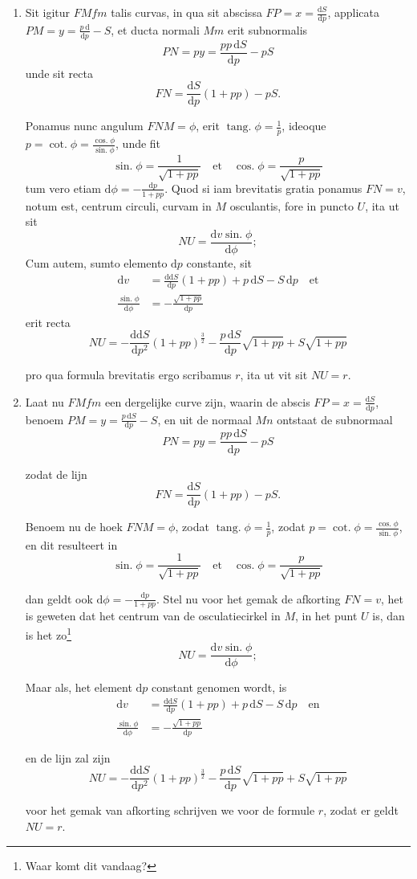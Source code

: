 \documentclass[10pt,a4paper]{article}
\newcommand{\switchenum}{\setcounter{enumi}{\arabic{enumi}-1}\switchcolumn}
\DeclareMathOperator{\tang}{tang.}
\DeclareMathOperator{\cotg}{cot.}
\DeclareMathOperator{\sing}{sin.}
\DeclareMathOperator{\cosg}{cos.}
\def\D{\mathrm{d}}
\begin{document}
\begin{paracol}{2}
\begin{enumerate}[topsep=1px]
		\item Sit igitur $FMfm$ talis curvas, in qua sit abscissa $FP=x=\frac{\D S}{\D p}$, applicata $PM=y=\frac{p\,\D }{\D p}-S$, et ducta normali $Mm$ erit subnormalis
		\[
			PN = py = \frac{pp\,\D S}{\D p}-pS
		\]
		unde sit recta
		\[
			FN = \frac{\D S}{\D p}(1+pp)-pS.
		\]
		\par Ponamus nunc angulum $FNM = \phi$, erit $\tang \phi = \frac{1}{p}$, ideoque $p=\cotg \phi = \frac{\cosg \phi}{\sing \phi}$, unde fit
		\[
			\sing \phi = \frac{1}{\sqrt{1+pp}} \quad \text{et} \quad \cosg \phi = \frac{p}{\sqrt{1+pp}}
		\]
		tum vero etiam $\D \phi = -\frac{\D p}{1+pp}$. Quod si iam brevitatis gratia ponamus $FN=v$, notum est, centrum circuli, curvam in $M$ osculantis, fore in puncto $U$, ita ut sit
		\[
			NU = \frac{\D v\sing \phi}{\D \phi};
		\]
		Cum autem, sumto elemento $\D p$ constante, sit
		\begin{align*}
			\D  v &= \frac{\D \D  S}{\D p}(1+pp)+p\,\D S-S\,\D p \quad \text{et}\\
			\frac{\sing \phi}{\D \phi} &= -\frac{\sqrt{1+pp}}{\D p}
		\end{align*}
		erit recta
		\[
			NU = -\frac{\D\D S}{\D p^2} (1+pp)^{\frac{3}{2}}-\frac{p\,\D S}{\D p} \sqrt{1+pp} + S\sqrt{1+pp}
		\]
		\par pro qua formula brevitatis ergo scribamus $r$, ita ut vit sit $NU=r$.
		
		\switchenum
		\item Laat nu $FMfm$ een dergelijke curve zijn, waarin de abscis $FP=x=\frac{\D S}{\D p}$, benoem $PM=y=\frac{p\, \D S}{\D p}-S$, en uit de normaal $Mn$ ontstaat de subnormaal
		\[
			PN = py = \frac{pp\,\D S}{\D p}-pS
		\]
		\par zodat de lijn
		\[
			FN = \frac{\D S}{\D p}(1+pp)-pS.
		\]
		\par Benoem nu de hoek $FNM = \phi$, zodat $\tang \phi = \frac{1}{p}$, zodat $p = \cotg \phi = \frac{\cosg \phi}{\sing \phi}$, en dit resulteert in
		\[
			\sing \phi = \frac{1}{\sqrt{1+pp}} \quad \text{et} \quad \cosg \phi = \frac{p}{\sqrt{1+pp}}
		\]
		\par dan geldt ook $\D \phi = -\frac{\D p}{1+pp}$. Stel nu voor het gemak de afkorting $FN=v$, het is geweten dat het centrum van de osculatiecirkel in $M$, in het punt $U$ is, dan is het zo\footnote{Waar komt dit vandaag?}
		\[
			NU = \frac{\D v\sing \phi}{\D \phi};
		\]
		\par Maar als, het element $\D p$ constant genomen wordt, is
		\begin{align*}
			\D  v &= \frac{\D \D  S}{\D p}(1+pp)+p\,\D S-S\,\D p \quad \text{en}\\
			\frac{\sing \phi}{\D \phi} &= -\frac{\sqrt{1+pp}}{\D p}
		\end{align*}
		\par en de lijn zal zijn
		\[
			NU = -\frac{\D\D S}{\D p^2} (1+pp)^{\frac{3}{2}}-\frac{p\,\D S}{\D p} \sqrt{1+pp} + S\sqrt{1+pp}
		\]
		\par voor het gemak van afkorting schrijven we voor de formule $r$, zodat er geldt $NU=r$.


\end{enumerate}
\end{paracol}
\end{document}

